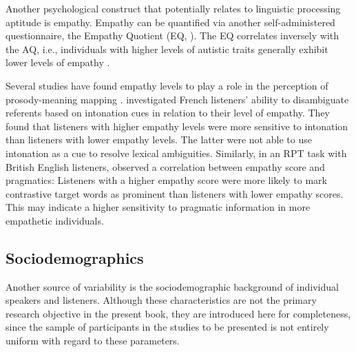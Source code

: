 Another psychological construct that potentially relates to linguistic processing aptitude is empathy. Empathy can be quantified via another self-administered questionnaire, the Empathy Quotient (EQ, \citealt{baron-cohenEmpathyQuotientInvestigation2004}). The EQ correlates inversely with the AQ, i.e., individuals with higher levels of autistic traits generally exhibit lower levels of empathy \citep{baron-cohenEmpathyQuotientInvestigation2004}.

Several studies have found empathy levels to play a role in the perception of prosody-meaning mapping \citep[e.g.,][]{esteve-gibertEmpathyInfluencesHow2020, orricoIndividualEmpathyLevels2020, orricoInfluenceEmpathyAutisticlike2023}. \citet{esteve-gibertEmpathyInfluencesHow2020} investigated French listeners' ability to disambiguate referents based on intonation cues in relation to their level of empathy. They found that listeners with higher empathy levels were more sensitive to intonation than listeners with lower empathy levels. The latter were not able to use intonation as a cue to resolve lexical ambiguities. Similarly, in an RPT task with British English listeners, \citet{orricoInfluenceEmpathyAutisticlike2023} observed a correlation between empathy score and pragmatics: Listeners with a higher empathy score were more likely to mark contrastive target words as prominent than listeners with lower empathy scores. This may indicate a higher sensitivity to pragmatic information in more empathetic individuals.

\subsection{Sociodemographics}

Another source of variability is the sociodemographic background of individual speakers and listeners. Although these characteristics are not the primary research objective in the present book, they are introduced here for completeness, since the sample of participants in the studies to be presented is not entirely uniform with regard to these parameters.


